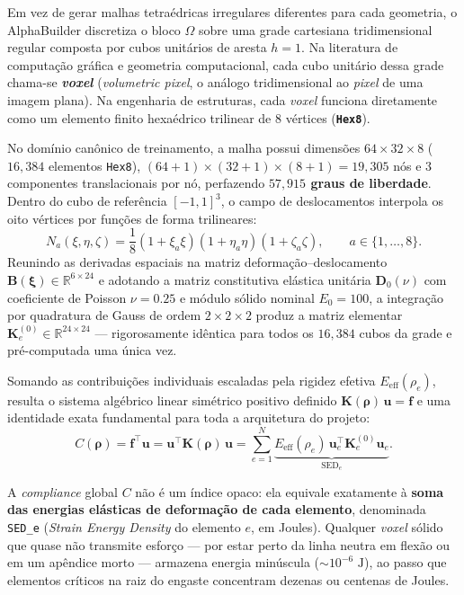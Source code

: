 \documentclass[11pt,a4paper]{article}
\begin{document}
Em vez de gerar malhas tetraédricas irregulares diferentes para cada geometria, o AlphaBuilder discretiza o bloco $\Omega$ sobre uma grade cartesiana tridimensional regular composta por cubos unitários de aresta $h=1$. Na literatura de computação gráfica e geometria computacional, cada cubo unitário dessa grade chama-se \textbf{\emph{voxel}} (\emph{volumetric pixel}, o análogo tridimensional ao \emph{pixel} de uma imagem plana). Na engenharia de estruturas, cada \emph{voxel} funciona diretamente como um elemento finito hexaédrico trilinear de $8$ vértices (\textbf{\texttt{Hex8}}).

No domínio canônico de treinamento, a malha possui dimensões $64 \times 32 \times 8$ ($16{,}384$ elementos \texttt{Hex8}), $(64+1)\times(32+1)\times(8+1) = 19{,}305$ nós e $3$ componentes translacionais por nó, perfazendo \textbf{$57{,}915$ graus de liberdade}. Dentro do cubo de referência $[-1, 1]^3$, o campo de deslocamentos interpola os oito vértices por funções de forma trilineares:
\begin{equation}
N_a(\xi, \eta, \zeta) = \frac{1}{8}(1 + \xi_a \xi)(1 + \eta_a \eta)(1 + \zeta_a \zeta), \qquad a \in \{1,\dots,8\}.
\end{equation}
Reunindo as derivadas espaciais na matriz deformação--deslocamento $\mathbf{B}(\boldsymbol{\xi}) \in \mathbb{R}^{6\times 24}$ e adotando a matriz constitutiva elástica unitária $\mathbf{D}_0(\nu)$ com coeficiente de Poisson $\nu = 0.25$ e módulo sólido nominal $E_0 = 100$, a integração por quadratura de Gauss de ordem $2\times 2\times 2$ produz a matriz elementar $\mathbf{K}_e^{(0)} \in \mathbb{R}^{24\times 24}$ — rigorosamente idêntica para todos os $16{,}384$ cubos da grade e pré-computada uma única vez.

Somando as contribuições individuais escaladas pela rigidez efetiva $E_{\mathrm{eff}}(\rho_e)$, resulta o sistema algébrico linear simétrico positivo definido $\mathbf{K}(\boldsymbol{\rho})\,\mathbf{u} = \mathbf{f}$ e uma identidade exata fundamental para toda a arquitetura do projeto:
\begin{equation}
C(\boldsymbol{\rho}) = \mathbf{f}^\top \mathbf{u} = \mathbf{u}^\top \mathbf{K}(\boldsymbol{\rho})\,\mathbf{u}
= \sum_{e=1}^{N} \underbrace{E_{\mathrm{eff}}(\rho_e)\,\mathbf{u}_e^\top \mathbf{K}_e^{(0)} \mathbf{u}_e}_{\mathrm{SED}_e}.
\end{equation}

A \emph{compliance} global $C$ não é um índice opaco: ela equivale exatamente à \textbf{soma das energias elásticas de deformação de cada elemento}, denominada \texttt{SED\_e} (\emph{Strain Energy Density} do elemento $e$, em Joules). Qualquer \emph{voxel} sólido que quase não transmite esforço — por estar perto da linha neutra em flexão ou em um apêndice morto — armazena energia minúscula ($\sim 10^{-6}\text{ J}$), ao passo que elementos críticos na raiz do engaste concentram dezenas ou centenas de Joules.
\end{document}
